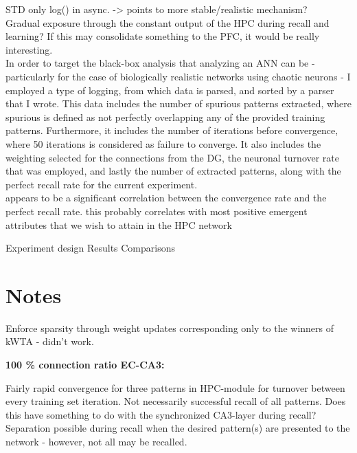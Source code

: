 STD only log() in async. -> points to more stable/realistic mechanism?
\\

Gradual exposure through the constant output of the HPC during recall and learning? If this may consolidate something to the PFC, it would be really interesting.
\\

In order to target the black-box analysis that analyzing an ANN can be - particularly for the case of biologically realistic networks using chaotic neurons - I employed a type of logging, from which data is parsed, and sorted by a parser that I wrote. This data includes the number of spurious patterns extracted, where spurious is defined as not perfectly overlapping any of the provided training patterns. Furthermore, it includes the number of iterations before convergence, where 50 iterations is considered as failure to converge. It also includes the weighting selected for the connections from the DG, the neuronal turnover rate that was employed, and lastly the number of extracted patterns, along with the perfect recall rate for the current experiment.
\\

appears to be a significant correlation between the convergence rate and the perfect recall rate. this probably correlates with most positive emergent attributes that we wish to attain in the HPC network


Experiment design
Results
Comparisons

\section*{Notes}

Enforce sparsity through weight updates corresponding only to the winners of kWTA - didn't work.

\textbf{100 \% connection ratio EC-CA3:}

Fairly rapid convergence for three patterns in HPC-module for turnover between every training set iteration. 
Not necessarily successful recall of all patterns. Does this have something to do with the synchronized CA3-layer during recall? Separation possible during recall when the desired pattern(s) are presented to the network - however, not all may be recalled.


